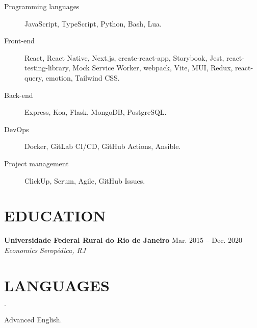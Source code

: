 \documentclass[12pt]{article}
\newenvironment{tightlist}
  {\begin{list}
    {$\cdot$}
    {
      \setlength{\leftmargin}{0em}
      \setlength{\itemsep}{\smallskipamount}
    }
  }
{\end{list}}
\begin{document}
\begin{description}
  \item[Programming languages] JavaScript, TypeScript, Python, Bash, Lua.
  \item[Front-end] React, React Native, Next.js, create-react-app, Storybook,
    Jest, react-testing-library, Mock Service Worker, webpack, Vite, MUI, Redux,
    react-query, emotion, Tailwind CSS.
  \item[Back-end] Express, Koa, Flask, MongoDB, PostgreSQL.
  \item[DevOps] Docker, GitLab CI/CD, GitHub Actions, Ansible.
  \item[Project management] ClickUp, Scrum, Agile, GitHub Issues.
\end{description}

\section*{EDUCATION}

\textbf{Universidade Federal Rural do Rio de Janeiro} \hfill {Mar. 2015 -- Dec. 2020} \\
\textit{Economics} \hfill \textit{Seropédica, RJ} {\parfillskip=0pt\par}

\section*{LANGUAGES}

\begin{tightlist}
  \item Advanced English.
\end{tightlist}
\end{document}
